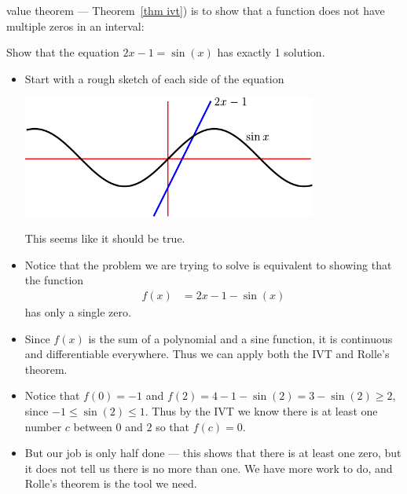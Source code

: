 value theorem --- Theorem~\ref{thm ivt}) is to show that a function does not have
multiple zeros in an interval:
\begin{eg}
Show that the equation $2x-1=\sin(x)$ has exactly 1 solution.
\begin{itemize}
\item Start with a rough sketch of each side of the equation
\begin{efig}
\begin{center}
 \includegraphics[height=4cm]{extra/rolle_sketch2}
\end{center}
\end{efig}
This seems like it should be true.

\item Notice that the problem we are trying to solve is equivalent to showing
that the function
\begin{align*}
  f(x) &= 2x-1-\sin(x)
\end{align*}
has only a single zero.
\item Since $f(x)$ is the sum of a polynomial and a sine function, it is continuous and
differentiable everywhere. Thus we can apply both the IVT and Rolle's theorem.
\item Notice that $f(0)=-1$ and $f(2) = 4-1-\sin(2) = 3-\sin(2) \geq 2$, since $-1\leq
\sin(2) \leq 1$. Thus by the IVT we know there is at least one number $c$ between $0$ and
$2$ so that $f(c)=0$.

\item But our job is only half done --- this shows that there is at least one zero, but
it does not tell us there is no more than one. We have more work to do, and Rolle's
theorem is the tool we need.


\end{itemize}
\end{eg}
